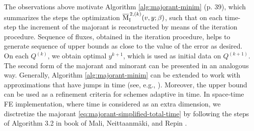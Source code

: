 %
The observations above motivate Algorithm \ref{alg:majorant-minim} (p. 39), 
which summarizes the steps the optimization $\overline{\mathrm M}^{\,2, (k)}_{\mathrm{I}} (v, y; \beta)$, 
such that on each time-step the increment
of the majorant is reconstructed by means of the iteration procedure. 
Sequence of fluxes, obtained in the iteration procedure, helps to generate sequence 
of upper bounds as close to the value of the error as desired. On each 
$Q^{(k)}$, we obtain optimal $y^{k+1}$, which is used as initial data on $Q^{(k+1)}$. 
The second form of the majorant and minorant can be presented in an analogous way. 
Generally, Algorithm \ref{alg:majorant-minim} can be extended to work with approximations that have jumps in time (see, e.g., \cite{RepinTomar2010}). 
Moreover, the upper bound can be used as a refinement criteria for schemes 
adaptive in time. In space-time FE 
implementation, where time is considered as an extra dimension, we disctretize the 
majorant \eqref{eq:majorant-simplified-total-time} by following the steps of 
Algorithm 3.2 in 
book of Mali, Neittaanm{\"a}ki, and Repin 
\cite[Section 3.3.1]{Malietall2014}.

